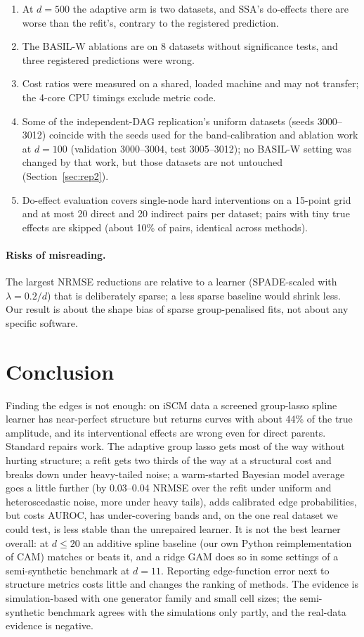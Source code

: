 \documentclass[11pt,a4paper]{article}
\begin{document}
\begin{enumerate}[leftmargin=*,itemsep=2pt]
  \item At $d=500$ the adaptive arm is two datasets, and SSA's do-effects there are worse than the refit's, contrary to the registered prediction.
  \item The BASIL-W ablations are on 8 datasets without significance tests, and three registered predictions were wrong.
  \item Cost ratios were measured on a shared, loaded machine and may not transfer; the 4-core CPU timings exclude metric code.
  \item Some of the independent-DAG replication's uniform datasets (seeds 3000--3012) coincide with the seeds used for the band-calibration and ablation work at $d=100$ (validation 3000--3004, test 3005--3012); no BASIL-W setting was changed by that work, but those datasets are not untouched (Section~\ref{sec:rep2}).
  \item Do-effect evaluation covers single-node hard interventions on a 15-point grid and at most 20 direct and 20 indirect pairs per dataset; pairs with tiny true effects are skipped (about 10\% of pairs, identical across methods).
\end{enumerate}

\paragraph{Risks of misreading.} The largest NRMSE reductions are relative to a learner (SPADE-scaled with $\lambda=0.2/d$) that is deliberately sparse; a less sparse baseline would shrink less. Our result is about the shape bias of sparse group-penalised fits, not about any specific software.

\section{Conclusion}
\label{sec:conclusion}
Finding the edges is not enough: on iSCM data a screened group-lasso spline learner has near-perfect structure but returns curves with about 44\% of the true amplitude, and its interventional effects are wrong even for direct parents. Standard repairs work. The adaptive group lasso gets most of the way without hurting structure; a refit gets two thirds of the way at a structural cost and breaks down under heavy-tailed noise; a warm-started Bayesian model average goes a little further (by 0.03--0.04 NRMSE over the refit under uniform and heteroscedastic noise, more under heavy tails), adds calibrated edge probabilities, but costs AUROC, has under-covering bands and, on the one real dataset we could test, is less stable than the unrepaired learner. It is not the best learner overall: at $d\le20$ an additive spline baseline (our own Python reimplementation of CAM) matches or beats it, and a ridge GAM does so in some settings of a semi-synthetic benchmark at $d=11$. Reporting edge-function error next to structure metrics costs little and changes the ranking of methods. The evidence is simulation-based with one generator family and small cell sizes; the semi-synthetic benchmark agrees with the simulations only partly, and the real-data evidence is negative.
\end{document}
